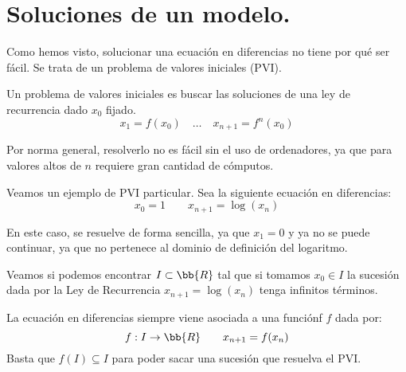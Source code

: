\section{Soluciones de un modelo.}

Como hemos visto, solucionar una ecuación en diferencias no tiene por qué ser fácil. Se trata de un problema de valores iniciales (PVI).
\begin{definicion}[PVI]
    Un problema de valores iniciales es buscar las soluciones de una ley de recurrencia dado $x_0$ fijado.
    \begin{equation*}
        x_1 = f(x_0) \quad \dots \quad x_{n+1} = f^n (x_0) 
    \end{equation*}
\end{definicion}
Por norma general, resolverlo no es fácil sin el uso de ordenadores, ya que para valores altos de $n$ requiere gran cantidad de cómputos.

\begin{ejemplo} Veamos un ejemplo de PVI particular. Sea la siguiente ecuación en diferencias:
$$x_0=1\qquad x_{n+1}=\log(x_n)$$

En este caso, se resuelve de forma sencilla, ya que $x_1=0$ y ya no se puede continuar, ya que no pertenece al dominio de definición del logaritmo.

\begin{observacion}
    Veamos si podemos encontrar $I\subset \bb{R}$ tal que si tomamos $x_0\in I$ la sucesión dada por la Ley de Recurrencia $x_{n+1}=\log(x_n)$ tenga infinitos términos.
\end{observacion}
\end{ejemplo}


La ecuación en diferencias siempre viene asociada a una funciónf $f$ dada por:
$$f:I \rightarrow \bb{R}\qquad x_{n+1} = f(x_n)$$
Basta que $f(I) \subseteq I$ para poder sacar una sucesión que resuelva el PVI.

